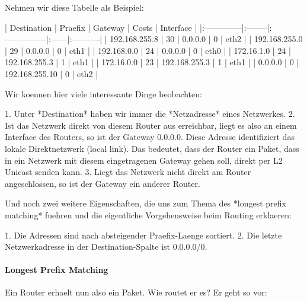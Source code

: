 Nehmen wir diese Tabelle als Beispiel:

|  Destination  | Praefix |    Gateway     | Costs | Interface |
|:--------------|:--------|:---------------|:------|:----------|
| 192.168.255.8 |    30   | 0.0.0.0        |   0   |    eth2   |
| 192.168.255.0 |    29   | 0.0.0.0        |   0   |    eth1   |
| 192.168.0.0   |    24   | 0.0.0.0        |   0   |    eth0   |
| 172.16.1.0    |    24   | 192.168.255.3  |   1   |    eth1   |
| 172.16.0.0    |    23   | 192.168.255.3  |   1   |    eth1   |
| 0.0.0.0       |    0    | 192.168.255.10 |   0   |    eth2   |

Wir koennen hier viele interessante Dinge beobachten:

1. Unter *Destination* haben wir immer die *Netzadresse* eines Netzwerkes.
2. Ist das Netzwerk direkt von diesem Router aus erreichbar, liegt es also an
   einem Interface des Routers, so ist der Gateway 0.0.0.0. Diese Adresse
   identifiziert das lokale Direktnetzwerk (local link). Das bedeutet, dass der
   Router ein Paket, dass in ein Netzwerk mit diesem eingetragenen Gateway gehen
   soll, direkt per L2 Unicast senden kann.
3. Liegt das Netzwerk nicht direkt am Router angeschlossen, so ist der Gateway
   ein anderer Router.

Und noch zwei weitere Eigenschaften, die uns zum Thema des *longest prefix
matching* fuehren und die eigentliche Vorgehensweise beim Routing erklaeren:

1. Die Adressen sind nach absteigender Praefix-Laenge sortiert.
2. Die letzte Netzwerkadresse in der Destination-Spalte ist 0.0.0.0/0.

\paragraph{Longest Prefix Matching} 

Ein Router erhaelt nun also ein Paket. Wie routet er es? Er geht so vor:

